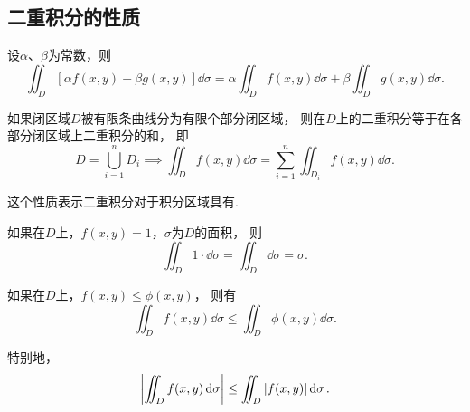\subsection{二重积分的性质}
\begin{property}\label{theorem:重积分.二重积分的性质1}
设\(\alpha\)、\(\beta\)为常数，则\begin{equation*}
\iint_D [\alpha f(x,y)+\beta g(x,y)] \dd{\sigma}
=\alpha \iint_D f(x,y) \dd{\sigma}
+\beta \iint_D g(x,y) \dd{\sigma}.
\end{equation*}
\end{property}

\begin{property}\label{theorem:重积分.二重积分的性质2}
如果闭区域\(D\)被有限条曲线分为有限个部分闭区域，
则在\(D\)上的二重积分等于在各部分闭区域上二重积分的和，
即\begin{equation*}
	D = \bigcup_{i=1}^n D_i
	\implies
	\iint_D f(x,y) \dd{\sigma}
	= \sum_{i=1}^n \iint_{D_i} f(x,y) \dd{\sigma}.
\end{equation*}
\end{property}
这个性质表示二重积分对于积分区域具有.

\begin{property}\label{theorem:重积分.二重积分的性质3}
如果在\(D\)上，\(f(x,y)=1\)，\(\sigma\)为\(D\)的面积，
则\begin{equation*}
	\iint_D 1\cdot\dd{\sigma}
	=\iint_D \dd{\sigma}
	=\sigma.
\end{equation*}
\end{property}

\begin{property}\label{theorem:重积分.二重积分的性质4}
如果在\(D\)上，\(f(x,y) \leq \phi(x,y)\)，
则有\begin{equation*}
	\iint_D f(x,y) \dd{\sigma} \leq \iint_D \phi(x,y) \dd{\sigma}.
\end{equation*}

特别地，\begin{equation*}
	\abs{\iint_D f(x,y) \dd{\sigma}} \leq \iint_D \abs{f(x,y)} \dd{\sigma}.
\end{equation*}
\end{property}


